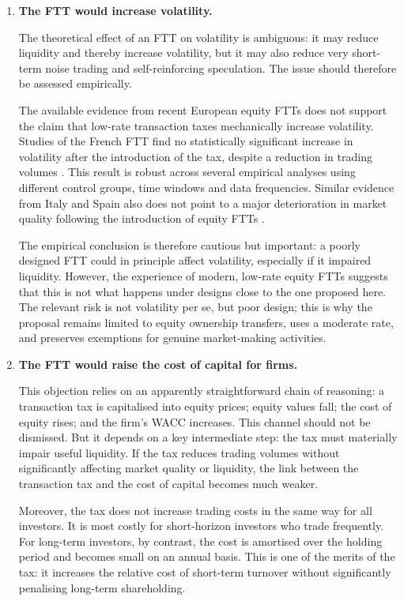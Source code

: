 \documentclass[../../main]{subfiles}
\begin{document}
\begin{enumerate}
    \item \textbf{The FTT would increase volatility.}

The theoretical effect of an FTT on volatility is ambiguous: it may reduce liquidity and thereby increase volatility, but it may also reduce very short-term noise trading and self-reinforcing speculation. The issue should therefore be assessed empirically.

The available evidence from recent European equity FTTs does not support the claim that low-rate transaction taxes mechanically increase volatility. Studies of the French FTT find no statistically significant increase in volatility after the introduction of the tax, despite a reduction in trading volumes \citep{Gomber2016,Meyer2015,CapelleBlancardHavrylchyk2016,ColliardHoffmann2017}. This result is robust across several empirical analyses using different control groups, time windows and data frequencies. Similar evidence from Italy and Spain also does not point to a major deterioration in market quality following the introduction of equity FTTs \citep{HvozdykRustanov2016,Cappelletti2017,Fuertes2024}.

The empirical conclusion is therefore cautious but important: a poorly designed FTT could in principle affect volatility, especially if it impaired liquidity. However, the experience of modern, low-rate equity FTTs suggests that this is not what happens under designs close to the one proposed here. The relevant risk is not volatility per se, but poor design; this is why the proposal remains limited to equity ownership transfers, uses a moderate rate, and preserves exemptions for genuine market-making activities.

    \item \textbf{The FTT would raise the cost of capital for firms.}

This objection relies on an apparently straightforward chain of reasoning: a transaction tax is capitalised into equity prices; equity values fall; the cost of equity rises; and the firm's WACC increases. This channel should not be dismissed. But it depends on a key intermediate step: the tax must materially impair useful liquidity. If the tax reduces trading volumes without significantly affecting market quality or liquidity, the link between the transaction tax and the cost of capital becomes much weaker.

Moreover, the tax does not increase trading costs in the same way for all investors. It is most costly for short-horizon investors who trade frequently. For long-term investors, by contrast, the cost is amortised over the holding period and becomes small on an annual basis. This is one of the merits of the tax: it increases the relative cost of short-term turnover without significantly penalising long-term shareholding.


\end{enumerate}
\end{document}
